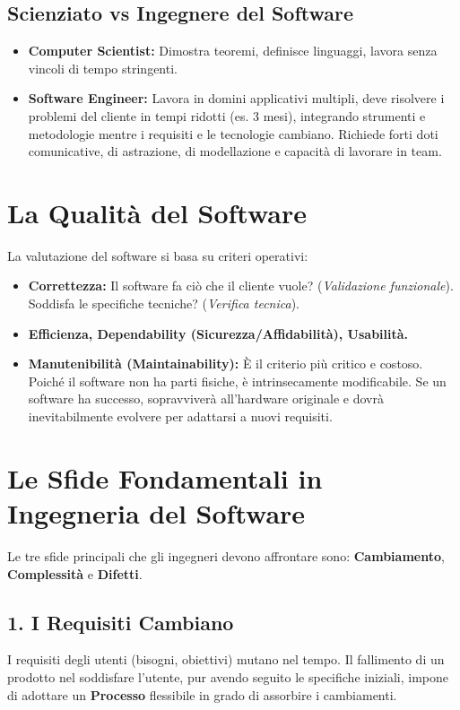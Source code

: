 \documentclass[12pt,a4paper,oneside]{book}
\begin{document}
\subsection{Scienziato vs Ingegnere del Software}
\begin{itemize}
    \item \textbf{Computer Scientist:} Dimostra teoremi, definisce linguaggi, lavora senza vincoli di tempo stringenti.
    \item \textbf{Software Engineer:} Lavora in domini applicativi multipli, deve risolvere i problemi del cliente in tempi ridotti (es. 3 mesi), integrando strumenti e metodologie mentre i requisiti e le tecnologie cambiano. Richiede forti doti comunicative, di astrazione, di modellazione e capacità di lavorare in team.
\end{itemize}

\section{La Qualità del Software}
La valutazione del software si basa su criteri operativi:
\begin{itemize}
    \item \textbf{Correttezza:} Il software fa ciò che il cliente vuole? (\textit{Validazione funzionale}). Soddisfa le specifiche tecniche? (\textit{Verifica tecnica}).
    \item \textbf{Efficienza, Dependability (Sicurezza/Affidabilità), Usabilità.}
    \item \textbf{Manutenibilità (Maintainability):} È il criterio più critico e costoso. Poiché il software non ha parti fisiche, è intrinsecamente modificabile. Se un software ha successo, sopravviverà all'hardware originale e dovrà inevitabilmente evolvere per adattarsi a nuovi requisiti.
\end{itemize}

\section{Le Sfide Fondamentali in Ingegneria del Software}
Le tre sfide principali che gli ingegneri devono affrontare sono: \textbf{Cambiamento}, \textbf{Complessità} e \textbf{Difetti}.

\subsection{1. I Requisiti Cambiano}
I requisiti degli utenti (bisogni, obiettivi) mutano nel tempo. Il fallimento di un prodotto nel soddisfare l'utente, pur avendo seguito le specifiche iniziali, impone di adottare un \textbf{Processo} flessibile in grado di assorbire i cambiamenti.
\end{document}
